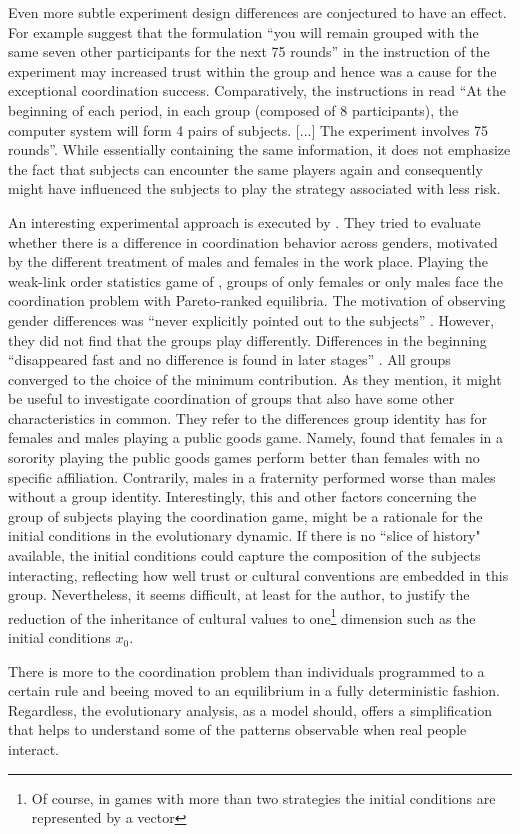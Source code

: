 Even more subtle experiment design differences are conjectured to have an
effect. For example \textcite{devetag_when_2007} suggest that the formulation
``you will remain grouped with the same seven other participants for the next
75 rounds'' in the instruction of the \textcite{rankin_strategic_2000}  
experiment may increased trust within the group and hence was a 
cause for the exceptional coordination success. Comparatively, the 
instructions in \textcite{dubois_optimization_2012} read ``At the beginning
of each period, in each group (composed of 8 participants), the computer
system will form 4 pairs of subjects. [...] The experiment 
involves 75 rounds''\parencite[378]{dubois_optimization_2012}. 
While essentially containing the same information,
it does not emphasize the fact that subjects can encounter the same 
players again and consequently might have influenced the subjects to play
the strategy associated with less risk.

An interesting experimental approach is executed by 
\textcite{dufwenberg_gender_2005}. They tried to evaluate whether 
there is a difference in coordination behavior across genders, motivated by 
the different treatment of males and females in the work place. Playing the 
weak-link order statistics game of \textcite{van_huyck_tacit_1990}, groups of 
only females or only males face the coordination problem with Pareto-ranked 
equilibria. The motivation of observing gender differences was 
``never explicitly pointed  out to the subjects'' 
\parencite{dufwenberg_gender_2005}.
However, they did not find that the groups play
differently. Differences in the beginning ``disappeared fast and no difference
is found in later stages'' \parencite[235]{dufwenberg_gender_2005}. 
All groups converged to the choice of the minimum
contribution. As they mention, it might be useful to investigate 
coordination of groups that also have some other 
characteristics in common. They refer to the differences group 
identity has for females and males playing a 
public goods game. Namely, \textcite{croson_groups_2008} found that 
females in a sorority playing the public goods games perform better than 
females with no specific affiliation. Contrarily, males in a fraternity 
performed worse than males without a group identity. 
Interestingly, this and other factors concerning the group of subjects 
playing the coordination game, might be a rationale for the 
initial conditions in the evolutionary dynamic. If there is no 
``slice of history" available,
the initial conditions could capture the composition of the subjects 
interacting, reflecting how well trust or cultural conventions 
are embedded in this group. 
Nevertheless, it seems difficult, at least for the author, to justify
the reduction of the inheritance of cultural values to 
one\footnote{Of course, in games with more than two strategies 
the initial conditions are represented by a vector} dimension such 
as the initial conditions $x_0$.

There is more to the coordination problem than individuals programmed to a
certain rule and beeing moved to an equilibrium in a fully deterministic 
fashion. Regardless, the evolutionary analysis, as a model should, offers
a simplification that helps to understand some of the patterns observable 
when real people interact.

